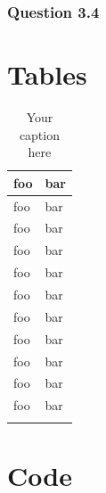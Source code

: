 \documentclass[a4paper]{article}
\begin{document}
    \subsubsection{Question 3.4}

	\newpage

	\appendix
	
	\section{Tables}
	
	\begin{longtable}{| p{} | p{} |} 
	\hline
	foo & bar \\ \hline 
	foo & bar \\ \hline
	foo & bar \\ \hline
	foo & bar \\ \hline
	foo & bar \\ \hline
	foo & bar \\ \hline
	foo & bar \\ \hline
	foo & bar \\ \hline
	foo & bar \\ \hline
	foo & bar \\ \hline
	foo & bar \\ \hline
	\caption{Your caption here} %
	\label{tab:myfirstlongtable}
\end{longtable}

	\section{Code}

 
\end{document}
